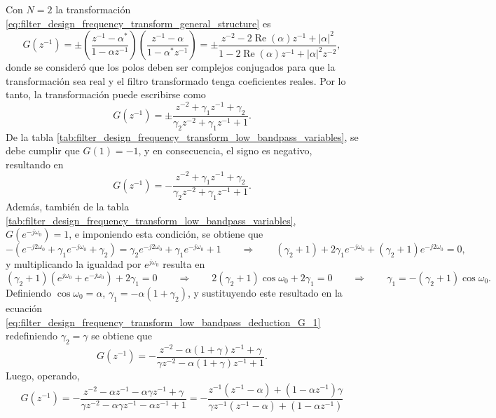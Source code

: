 \documentclass[a4paper]{report}
\renewcommand{\Re}{\operatorname{Re}}
\begin{document}
Con \(N=2\) la transformación \ref{eq:filter_design_frequency_transform_general_structure} es
\begin{equation}\label{eq:filter_design_frequency_transform_low_bandpass_deduction_G_3}
 G(z^{-1})=\pm\left(\frac{z^{-1}-\alpha^*}{1-\alpha z^{-1}}\right)\left(\frac{z^{-1}-\alpha}{1-\alpha^*z^{-1}}\right)
  =\pm\frac{z^{-2}-2\Re(\alpha)z^{-1}+|\alpha|^2}{1-2\Re(\alpha)z^{-1}+|\alpha|^2z^{-2}}, 
\end{equation}
donde se consideró que los polos deben ser complejos conjugados para que la transformación sea real y el filtro transformado tenga coeficientes reales. Por lo tanto, la transformación puede escribirse como
\begin{equation}
 G(z^{-1})=\pm\frac{z^{-2}+\gamma_1z^{-1}+\gamma_2}{\gamma_2z^{-2}+\gamma_1z^{-1}+1}. 
\end{equation}
De la tabla \ref{tab:filter_design_frequency_transform_low_bandpass_variables}, se debe cumplir que \(G(1)=-1\), y en consecuencia, el signo es negativo, resultando en
\begin{equation}\label{eq:filter_design_frequency_transform_low_bandpass_deduction_G_1}
 G(z^{-1})=-\frac{z^{-2}+\gamma_1z^{-1}+\gamma_2}{\gamma_2z^{-2}+\gamma_1z^{-1}+1}. 
\end{equation}
Además, también de la tabla \ref{tab:filter_design_frequency_transform_low_bandpass_variables}, \(G(e^{-j\omega_0})=1\), e imponiendo esta condición, se obtiene que 
\[
 -(e^{-j2\omega_0}+\gamma_1e^{-j\omega_0}+\gamma_2)=\gamma_2e^{-j2\omega_0}+\gamma_1e^{-j\omega_0}+1
 \qquad\Rightarrow\qquad
 (\gamma_2+1)+2\gamma_1e^{-j\omega_0}+(\gamma_2+1)e^{-j2\omega_0}=0,
\]
y multiplicando la igualdad por \(e^{j\omega_0}\) resulta en
\[
 (\gamma_2+1)(e^{j\omega_0}+e^{-j\omega_0})+2\gamma_1=0
 \qquad\Rightarrow\qquad
 2(\gamma_2+1)\cos\omega_0+2\gamma_1=0
 \qquad\Rightarrow\qquad
 \gamma_1=-(\gamma_2+1)\cos\omega_0.
\]
Definiendo \(\cos\omega_0=\alpha\), \(\gamma_1=-\alpha(1+\gamma_2)\), y sustituyendo este resultado en la ecuación \ref{eq:filter_design_frequency_transform_low_bandpass_deduction_G_1} redefiniendo \(\gamma_2=\gamma\) se obtiene que
\begin{equation}\label{eq:filter_design_frequency_transform_low_bandpass_deduction_G_2}
 G(z^{-1})=-\frac{z^{-2}-\alpha(1+\gamma)z^{-1}+\gamma}{\gamma z^{-2}-\alpha(1+\gamma)z^{-1}+1}. 
\end{equation}
Luego, operando,
\[
 G(z^{-1})=-\frac{z^{-2}-\alpha z^{-1}-\alpha\gamma z^{-1}+\gamma}{\gamma z^{-2}-\alpha\gamma z^{-1}-\alpha z^{-1}+1}
  =-\frac{z^{-1}(z^{-1}-\alpha)+(1-\alpha z^{-1})\gamma}{\gamma z^{-1}(z^{-1}-\alpha)+(1-\alpha z^{-1})}
\]
\end{document}
